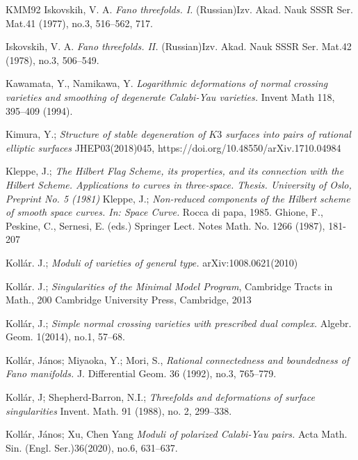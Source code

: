 \documentclass[11pt,twoside]{amsart}
\theoremstyle{plain}
\numberwithin{equation}{section}
\theoremstyle{definition}
\begin{document}
\begin{thebibliography}{KMM92}
Iskovskih, V. A.
\emph{Fano threefolds. I.}
(Russian)Izv. Akad. Nauk SSSR Ser. Mat.41 (1977), no.3, 516–562, 717.

Iskovskih, V. A.
\emph{Fano threefolds. II.}
(Russian)Izv. Akad. Nauk SSSR Ser. Mat.42 (1978), no.3, 506–549.

Kawamata, Y., Namikawa, Y. 
\emph{Logarithmic deformations of normal crossing varieties and smoothing of degenerate Calabi-Yau varieties.}
Invent Math 118, 395–409 (1994).

Kimura, Y.;
\emph{Structure of stable degeneration of $K3$ surfaces into pairs of rational elliptic surfaces}
JHEP03(2018)045, https://doi.org/10.48550/arXiv.1710.04984

Kleppe, J.; 
\emph{The Hilbert Flag Scheme, its properties, and its connection with the Hilbert Scheme. Applications to curves in three-space. Thesis. University of Oslo, Preprint No. 5 (1981)}
Kleppe, J.;
\emph{Non-reduced components of the Hilbert scheme of smooth space curves. In: Space Curve.}
Rocca di papa, 1985. Ghione, F., Peskine, C., Sernesi, E. (eds.) Springer Lect. Notes Math. No. 1266 (1987), 181-207

Koll\'ar. J.;
\emph{Moduli of varieties of general type.} arXiv:1008.0621(2010)

  \color{black}

Koll\'ar. J.; \emph{Singularities of the Minimal Model Program}, Cambridge Tracts in Math., 200
Cambridge University Press, Cambridge, 2013

  \color{black}

Koll\'ar, J.;
\emph{Simple normal crossing varieties with prescribed dual complex.}
Algebr. Geom. 1(2014), no.1, 57–68.

 \color{black}

 Kollár, János; Miyaoka, Y.; Mori, S., 
\emph{Rational connectedness and boundedness of Fano manifolds.} J. Differential Geom. 36 (1992), no.3, 765--779.

 \color{black}

Koll\'ar, J;  Shepherd-Barron, N.I.;
\emph{Threefolds and deformations of surface
singularities}
Invent. Math. 91 (1988), no. 2, 299–338.

Kollár, János; Xu, Chen Yang
\emph{Moduli of polarized Calabi-Yau pairs.}
Acta Math. Sin. (Engl. Ser.)36(2020), no.6, 631–637.




\end{thebibliography}
\end{document}

